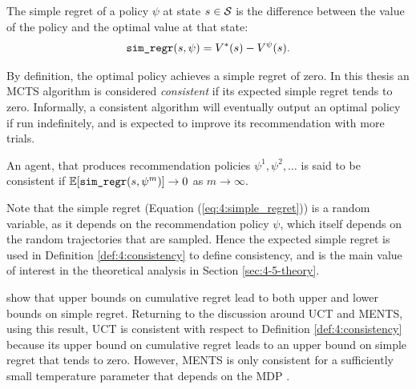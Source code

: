     \begin{defn}
        \label{def:4:simple_regret}
        The \textnormal{simple regret} of a policy $\psi$ at state $s\in\mathcal{S}$ is the difference between the value of the policy and the optimal value at that state:
        \begin{align}
            {\textnormal{\texttt{sim\_regr}}}(s,\psi) = V^*(s)-V^{\psi}(s). \label{eq:4:simple_regret}
        \end{align}
    \end{defn}

    By definition, the optimal policy achieves a simple regret of zero. In this thesis an MCTS algorithm is considered \textit{consistent} if its expected simple regret tends to zero. Informally, a consistent algorithm will eventually output an optimal policy if run indefinitely, and is expected to improve its recommendation with more trials.

    \begin{defn}
        \label{def:4:consistency}
        An agent, that produces recommendation policies $\psi^1,\psi^2,\ldots$ is said to be \textnormal{consistent} if $\mathbb{E}[{\textnormal{\texttt{sim\_regr}}}(s,\psi^m)] \rightarrow 0$ as $m\rightarrow \infty$.
    \end{defn}

    Note that the simple regret (Equation (\ref{eq:4:simple_regret})) is a random variable, as it depends on the recommendation policy $\psi$, which itself depends on the random trajectories that are sampled. Hence the expected simple regret is used in Definition \ref{def:4:consistency} to define consistency, and is the main value of interest in the theoretical analysis in Section \ref{sec:4-5-theory}.

    \citet{exploring_bandit} show that upper bounds on cumulative regret lead to both upper and lower bounds on simple regret. Returning to the discussion around UCT and MENTS, using this result, UCT is consistent with respect to Definition \ref{def:4:consistency} because its upper bound on cumulative regret \cite{uct_long} leads to an upper bound on simple regret that tends to zero. However, MENTS is only consistent for a sufficiently small temperature parameter that depends on the MDP \cite{dents}. %









